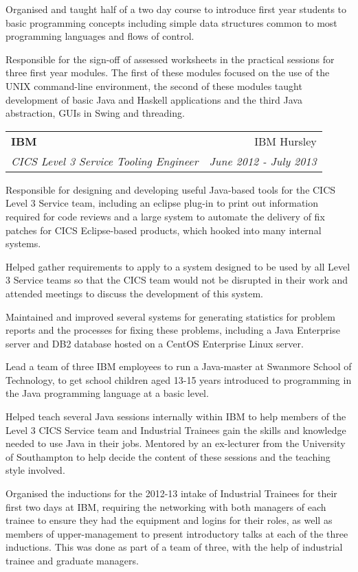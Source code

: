 \documentclass[letterpaper,11pt]{article}
\makeatletter
\newcommand{\ressubheading}[4]{
\vspace{10pt}
\begin{tabular*}{6.5in}{l@{\cftdotfill{\cftsecdotsep}\extracolsep{\fill}}r}
		\textbf{#1} & #2 \\
		\textit{#3} & \textit{#4} \\
\end{tabular*}\vspace{-6pt}
\vspace{10pt}}
\makeatother
\begin{document}
Organised and taught half of a two day course to introduce first year students
to basic programming concepts including simple data structures common to most
programming languages and flows of control.

Responsible for the sign-off of assessed worksheets in the practical sessions
for three first year modules. The first of these modules
focused on the use of the UNIX command-line environment, the second of these
modules taught development of basic Java and Haskell applications and the third
Java abstraction, GUIs in Swing and threading.

\ressubheading{IBM}{IBM Hursley}{CICS Level 3 Service Tooling Engineer}
{June 2012 - July 2013}

Responsible for designing and developing useful Java-based tools for the CICS 
Level 3 Service team, including an eclipse plug-in to print out information 
required for code reviews and a large system to automate the delivery of fix 
patches for CICS Eclipse-based products, which hooked into many internal 
systems.

Helped gather requirements to apply to a system designed to be used by all 
Level 3 Service teams so that the CICS team would not be disrupted in their 
work and attended meetings to discuss the development of this system.

Maintained and improved several systems for generating statistics for problem 
reports and the processes for fixing these problems, including a Java 
Enterprise server and DB2 database hosted on a CentOS Enterprise Linux server.

Lead a team of three IBM employees to run a Java-master at Swanmore School of 
Technology, to get school children aged 13-15 years introduced to programming 
in the Java programming language at a basic level.

Helped teach several Java sessions internally within IBM to help members of the
Level 3 CICS Service team and Industrial Trainees gain the skills and knowledge
needed to use Java in their jobs. Mentored by an ex-lecturer from the 
University of Southampton to help decide the content of these sessions and the 
teaching style involved.

Organised the inductions for the 2012-13 intake of Industrial Trainees for 
their first two days at IBM, requiring the networking with both managers of 
each trainee to ensure they had the equipment and logins for their roles, as 
well as members of upper-management to present introductory talks at each of 
the three inductions. This was done as part of a team of three, with the help 
of industrial trainee and graduate managers.
\end{document}
